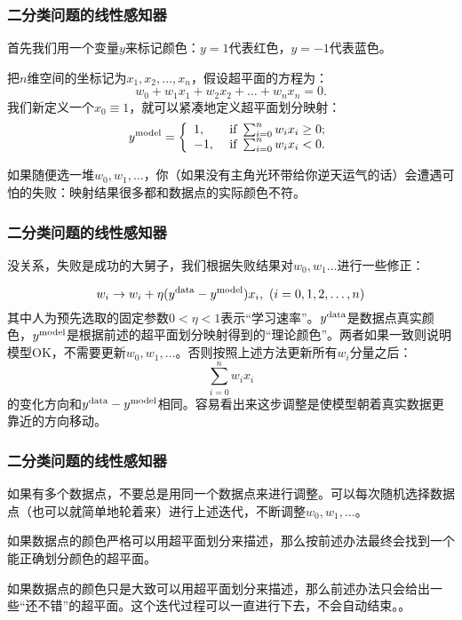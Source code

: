 \documentclass[CJK]{beamer}
\begin{document}
  \begin{frame}
    \frametitle{二分类问题的线性感知器}
    首先我们用一个变量$y$来标记颜色：$y=1$代表红色，$y=-1$代表蓝色。

    \skiplines
    
    把$n$维空间的坐标记为$x_1, x_2,\ldots, x_n$，假设超平面的方程为：
    $$ w_0 + w_1 x_1 + w_2x_2+\ldots+w_nx_n = 0. $$
    我们新定义一个$x_0\equiv 1$，就可以紧凑地定义超平面划分映射：
    \begin{equation}
      y^{\rm model} = \left\{
        \begin{array}{ll}
          1, & \text{ if } \sum_{i=0}^n w_ix_i \ge 0; \\
          -1, & \text{ if } \sum_{i=0}^n w_ix_i < 0.
        \end{array}
        \right.
    \end{equation}
    
    如果随便选一堆$w_0,w_1,\ldots$，你（如果没有主角光环带给你逆天运气的话）会遭遇可怕的失败：映射结果很多都和数据点的实际颜色不符。    
  \end{frame}


  \begin{frame}
    \frametitle{二分类问题的线性感知器}
        
    没关系，失败是成功的大舅子，我们根据失败结果对$w_0,w_1\ldots$进行一些修正：

    $$w_i \rightarrow w_i + \eta(y^{\rm data}-y^{\rm model})x_i,\ (i=0,1,2,\ldots,n)$$
    其中人为预先选取的固定参数$0<\eta<1$表示“学习速率”。$y^{\rm data}$是数据点真实颜色，$y^{\rm model}$是根据前述的超平面划分映射得到的“理论颜色”。两者如果一致则说明模型OK，不需要更新$w_0,w_1,\ldots$。否则按照上述方法更新所有$w_i$分量之后：
    $$ \sum_{i=0}^n w_ix_i $$
    的变化方向和$y^{\rm data} - y^{\rm model} $相同。容易看出来这步调整是使模型朝着真实数据更靠近的方向移动。

    
  \end{frame}


  \begin{frame}
    \frametitle{二分类问题的线性感知器}
    如果有多个数据点，不要总是用同一个数据点来进行调整。可以每次随机选择数据点（也可以就简单地轮着来）进行上述迭代，不断调整$w_0,w_1,\ldots$。
    
    \skiplines
    
    如果数据点的颜色严格可以用超平面划分来描述，那么按前述办法最终会找到一个能正确划分颜色的超平面。

    \skiplines
    
    如果数据点的颜色只是大致可以用超平面划分来描述，那么前述办法只会给出一些“还不错”的超平面。这个迭代过程可以一直进行下去，不会自动结束。。
  \end{frame}
\end{document}
